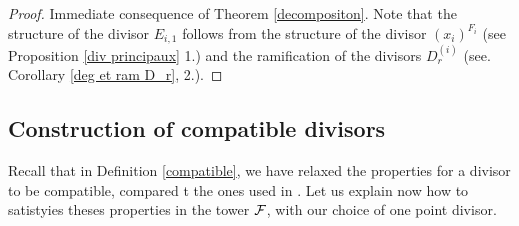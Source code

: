 \documentclass[10pt]{article}
\begin{document}
\s

\begin{proof}
Immediate consequence of Theorem \ref{decompositon}. Note that the structure of the divisor $E_{i,1}$ follows from the structure of the divisor $(x_i)^{F_i}$ (see Proposition \ref{div principaux} 1.) and the ramification of the divisors $D_r^{(i)}$ (see. Corollary \ref{deg et ram D_r}, 2.). 
\end{proof}

\s

\subsection{Construction of compatible divisors}

\s

Recall that in Definition \ref{compatible}, we have relaxed the properties for a divisor to be compatible, compared t the ones used in \cite{IOPP}. Let us explain now how to satistyies theses properties in the tower $\mathcal{F}$, with our choice of one point divisor.



\newpage


\end{document}
